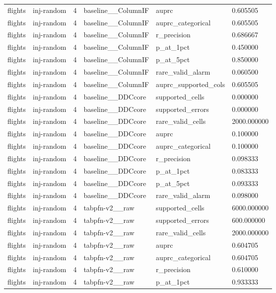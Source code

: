 \begin{tabular}{llllll}
flights & inj-random & 4 & baseline\_\_ColumnIF & auprc & 0.605505 \\
flights & inj-random & 4 & baseline\_\_ColumnIF & auprc\_categorical & 0.605505 \\
flights & inj-random & 4 & baseline\_\_ColumnIF & r\_precision & 0.686667 \\
flights & inj-random & 4 & baseline\_\_ColumnIF & p\_at\_1pct & 0.450000 \\
flights & inj-random & 4 & baseline\_\_ColumnIF & p\_at\_5pct & 0.850000 \\
flights & inj-random & 4 & baseline\_\_ColumnIF & rare\_valid\_alarm & 0.060500 \\
flights & inj-random & 4 & baseline\_\_ColumnIF & auprc\_supported\_cols & 0.605505 \\
flights & inj-random & 4 & baseline\_\_DDCcore & supported\_cells & 0.000000 \\
flights & inj-random & 4 & baseline\_\_DDCcore & supported\_errors & 0.000000 \\
flights & inj-random & 4 & baseline\_\_DDCcore & rare\_valid\_cells & 2000.000000 \\
flights & inj-random & 4 & baseline\_\_DDCcore & auprc & 0.100000 \\
flights & inj-random & 4 & baseline\_\_DDCcore & auprc\_categorical & 0.100000 \\
flights & inj-random & 4 & baseline\_\_DDCcore & r\_precision & 0.098333 \\
flights & inj-random & 4 & baseline\_\_DDCcore & p\_at\_1pct & 0.083333 \\
flights & inj-random & 4 & baseline\_\_DDCcore & p\_at\_5pct & 0.093333 \\
flights & inj-random & 4 & baseline\_\_DDCcore & rare\_valid\_alarm & 0.098000 \\
flights & inj-random & 4 & tabpfn-v2\_\_raw & supported\_cells & 6000.000000 \\
flights & inj-random & 4 & tabpfn-v2\_\_raw & supported\_errors & 600.000000 \\
flights & inj-random & 4 & tabpfn-v2\_\_raw & rare\_valid\_cells & 2000.000000 \\
flights & inj-random & 4 & tabpfn-v2\_\_raw & auprc & 0.604705 \\
flights & inj-random & 4 & tabpfn-v2\_\_raw & auprc\_categorical & 0.604705 \\
flights & inj-random & 4 & tabpfn-v2\_\_raw & r\_precision & 0.610000 \\
flights & inj-random & 4 & tabpfn-v2\_\_raw & p\_at\_1pct & 0.933333 \\

\end{tabular}

